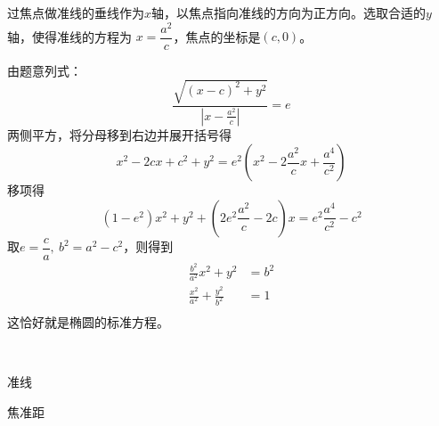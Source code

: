 \begin{jie}
    过焦点做准线的垂线作为\(x\)轴，以焦点指向准线的方向为正方向。选取合适的\(y\)轴，使得准线的方程为
    \(x=\dfrac{a^2}{c}\)，焦点的坐标是\((c,0)\)。
    
    由题意列式：
       \[ \frac{\sqrt{(x-c)^2+y^2}}{\left|x-\frac{a^2}{c}\right|}=e\]
两侧平方，将分母移到右边并展开括号得
\[x^2-2cx+c^2+y^2=e^2\left(x^2-2\frac{a^2}{c}x+\frac{a^4}{c^2}\right)\]    
移项得
\[\left(1-e^2\right)x^2+y^2+\left(2e^2\frac{a^2}{c}-2c\right)x=e^2\frac{a^4}{c^2}-c^2\]
取\(e=\dfrac{c}{a},\ b^2=a^2-c^2\)，则得到
\vspace*{-0.5cm}
\begin{align*}
    \frac{b^2}{a^2}x^2+y^2&=b^2\\
    \frac{x^2}{a^2}+\frac{y^2}{b^2}&=1\\
\end{align*}
这恰好就是椭圆的标准方程。
\end{jie}
\begin{character}
    \ 
    
    准线

    焦准距
\end{character}

\begin{theorem}[焦半径公式]
    
\end{theorem}









\clearpage
\clearpage
